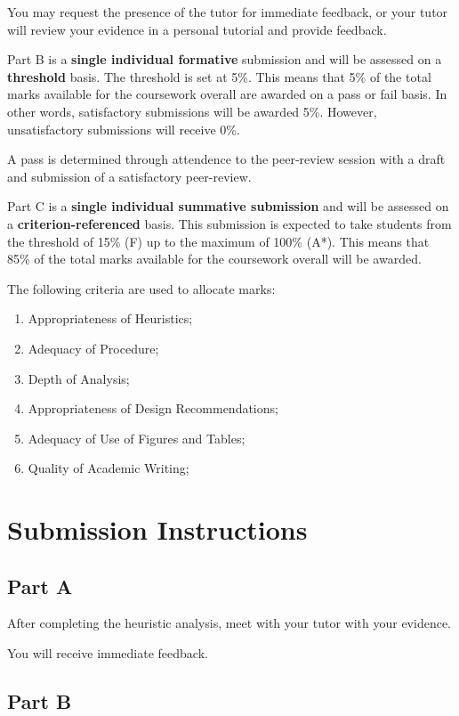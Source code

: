 \documentclass{../fal_assignment}
\begin{document}
You may request the presence of the tutor for immediate feedback, or your tutor will review your evidence in a personal tutorial and provide feedback.

Part B is a \textbf{single individual formative} submission and will be assessed on a \textbf{threshold} basis. The threshold is set at 5\%. This means that 5\% of the total marks available for the coursework overall are awarded on a pass or fail basis. In other words, satisfactory submissions will be awarded 5\%. However, unsatisfactory submissions will receive 0\%.

A pass is determined through attendence to the peer-review session with a draft and submission of a satisfactory peer-review.

Part C is a \textbf{single individual summative submission} and will be assessed on a \textbf{criterion-referenced} basis. This submission is expected to take students from the threshold of 15\% (F) up to the maximum of 100\% (A*). This means that 85\% of the total marks available for the coursework overall will be awarded.

The following criteria are used to allocate marks:

\begin{enumerate}[label=(\alph*)]
	\item Appropriateness of Heuristics;
	\item Adequacy of Procedure;
	\item Depth of Analysis;
	\item Appropriateness of Design Recommendations;
	\item Adequacy of Use of Figures and Tables;
	\item Quality of Academic Writing;
\end{enumerate}

\section*{Submission Instructions}

\subsection*{Part A}

After completing the heuristic analysis, meet with your tutor with your evidence.

You will receive immediate feedback.

\subsection*{Part B}
\end{document}
